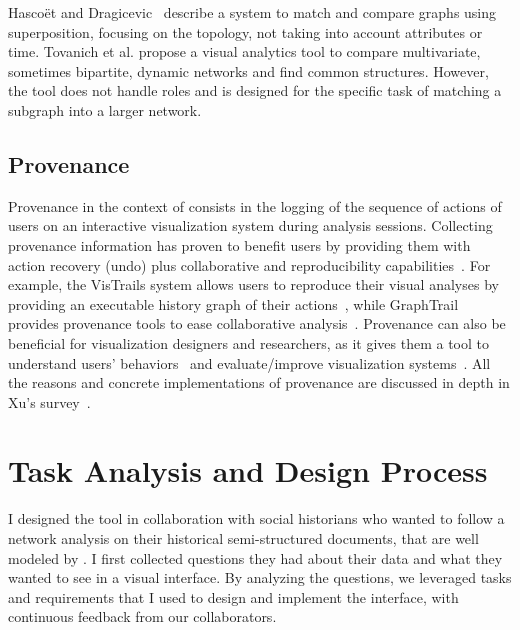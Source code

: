 Hascoët and Dragicevic~\cite{HascoetD12} describe a system to match and compare graphs using superposition, focusing on the topology, not taking into account attributes or time.
Tovanich et al.\cite{tovanichVAST2020Contest2021} propose a visual analytics tool to compare multivariate, sometimes bipartite, dynamic networks and find common structures.
However, the tool does not handle roles and is designed for the specific task of matching a subgraph into a larger network.

\subsection{Provenance}

Provenance in the context of \va consists in the logging of the sequence of actions of users on an interactive visualization system during analysis sessions.
Collecting provenance information has proven to benefit users by providing them with action recovery (undo) plus collaborative and reproducibility capabilities~\cite{raganCharacterizingProvenanceVisualization2016}.
For example, the VisTrails system allows users to reproduce their visual analyses by providing an executable history graph of their actions~\cite{callahanVisTrailsVisualizationMeets2006}, while GraphTrail provides provenance tools to ease collaborative analysis~\cite{dunneGraphTrailAnalyzingLarge2012}.
Provenance can also be beneficial for visualization designers and researchers, as it gives them a tool to understand users' behaviors~\cite{battleCharacterizingExploratoryVisual2019, borsProvenanceTaskAbstraction2019}
and evaluate/improve visualization systems~\cite{renCharticulatorInteractiveConstruction2019}.
All the reasons and concrete implementations of provenance are discussed in depth in Xu's survey~\cite{xuSurveyAnalysisUser2020}.

\section{Task Analysis and Design Process}\label{sec:combinet-tasks}

I designed the \name tool in collaboration with social historians who wanted to follow a network analysis on their historical semi-structured documents, that are well modeled by \modelplural.
I first collected questions they had about their data and what they wanted to see in a visual interface.
By analyzing the questions, we leveraged tasks and requirements that I used to design and implement the interface, with continuous feedback from our collaborators.

